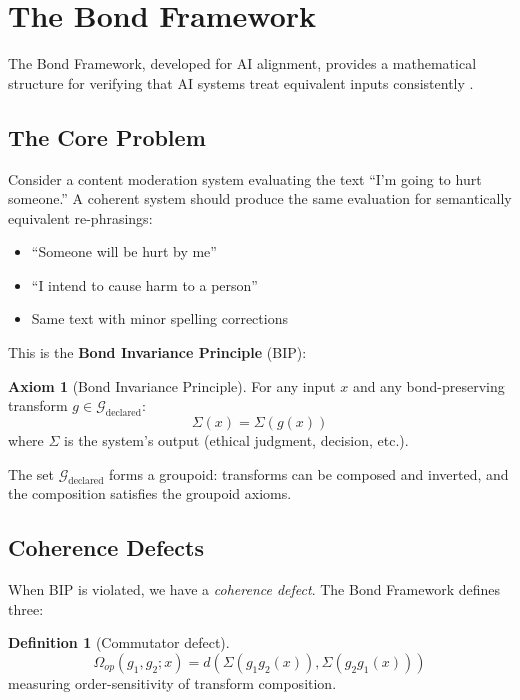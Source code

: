 \documentclass[12pt,letterpaper]{article}
\theoremstyle{definition}
\newtheorem{definition}[theorem]{Definition}
\newtheorem{axiom}{Axiom}
\theoremstyle{remark}
\newcommand{\G}{\mathcal{G}}
\begin{document}
\section{The Bond Framework}

The Bond Framework, developed for AI alignment, provides a mathematical structure for verifying that AI systems treat equivalent inputs consistently \cite{bond2025categorical}.

\subsection{The Core Problem}

Consider a content moderation system evaluating the text ``I'm going to hurt someone.'' A coherent system should produce the same evaluation for semantically equivalent re-phrasings:
\begin{itemize}
    \item ``Someone will be hurt by me''
    \item ``I intend to cause harm to a person''
    \item Same text with minor spelling corrections
\end{itemize}

This is the \textbf{Bond Invariance Principle} (BIP):

\begin{axiom}[Bond Invariance Principle]
For any input $x$ and any bond-preserving transform $g \in \G_{\text{declared}}$:
\begin{equation}
\Sigma(x) = \Sigma(g(x))
\end{equation}
where $\Sigma$ is the system's output (ethical judgment, decision, etc.).
\end{axiom}

The set $\G_{\text{declared}}$ forms a groupoid: transforms can be composed and inverted, and the composition satisfies the groupoid axioms.

\subsection{Coherence Defects}

When BIP is violated, we have a \textit{coherence defect}. The Bond Framework defines three:

\begin{definition}[Commutator defect]
\begin{equation}
\Omega_{op}(g_1, g_2; x) = d(\Sigma(g_1 g_2 (x)), \Sigma(g_2 g_1 (x)))
\end{equation}
measuring order-sensitivity of transform composition.
\end{definition}
\end{document}
